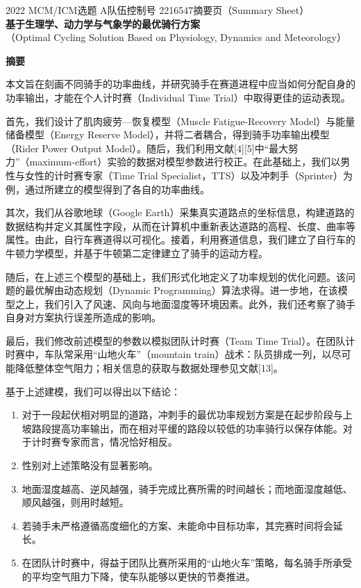 \documentclass[11pt,a4paper]{ctexart}
\begin{document}
\thispagestyle{empty}
\begin{center}
{\small 2022 MCM/ICM\quad 选题 A\quad 队伍控制号 2216547\quad 摘要页（Summary Sheet）}\\[18pt]
{\LARGE\bfseries 基于生理学、动力学与气象学的最优骑行方案}\\[8pt]
{\large （Optimal Cycling Solution Based on Physiology, Dynamics and Meteorology）}\\[10pt]
\end{center}

\begin{center}
{\large\bfseries 摘\quad 要}
\end{center}

\vspace{6pt}
本文旨在刻画不同骑手的功率曲线，并研究骑手在赛道进程中应当如何分配自身的功率输出，才能在个人计时赛（Individual Time Trial）中取得更佳的运动表现。

首先，我们设计了肌肉疲劳—恢复模型（Muscle Fatigue-Recovery Model）与能量储备模型（Energy Reserve Model），并将二者耦合，得到骑手功率输出模型（Rider Power Output Model）。随后，我们利用文献[4][5]中“最大努力”（maximum-effort）实验的数据对模型参数进行校正。在此基础上，我们以男性与女性的计时赛专家（Time Trial Specialist，TTS）以及冲刺手（Sprinter）为例，通过所建立的模型得到了各自的功率曲线。

其次，我们从谷歌地球（Google Earth）采集真实道路点的坐标信息，构建道路的数据结构并定义其属性字段，从而在计算机中重新表达道路的高程、长度、曲率等属性。由此，自行车赛道得以可视化。接着，利用赛道信息，我们建立了自行车的牛顿力学模型，并基于牛顿第二定律建立了骑手的运动方程。

随后，在上述三个模型的基础上，我们形式化地定义了功率规划的优化问题。该问题的最优解由动态规划（Dynamic Programming）算法求得。进一步地，在该模型之上，我们引入了风速、风向与地面湿度等环境因素。此外，我们还考察了骑手自身对方案执行误差所造成的影响。

最后，我们修改前述模型的参数以模拟团队计时赛（Team Time Trial）。在团队计时赛中，车队常采用“山地火车”（mountain train）战术：队员排成一列，以尽可能降低整体空气阻力；相关信息的获取与数据处理参见文献[13]。

基于上述建模，我们可以得出以下结论：

\begin{enumerate}
\item 对于一段起伏相对明显的道路，冲刺手的最优功率规划方案是在起步阶段与上坡路段提高功率输出，而在相对平缓的路段以较低的功率骑行以保存体能。对于计时赛专家而言，情况恰好相反。
\item 性别对上述策略没有显著影响。
\item 地面湿度越高、逆风越强，骑手完成比赛所需的时间越长；而地面湿度越低、顺风越强，则用时越短。
\item 若骑手未严格遵循高度细化的方案、未能命中目标功率，其完赛时间将会延长。
\item 在团队计时赛中，得益于团队比赛所采用的“山地火车”策略，每名骑手所承受的平均空气阻力下降，使车队能够以更快的节奏推进。
\end{enumerate}
\end{document}
